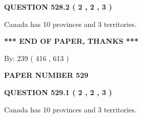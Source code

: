 \documentclass[12pt]{article}
\begin{document}
 
  
\vspace{0.2in}
  
{\textbf{\Large{QUESTION
528.2 
 ( 2 , 2 , 3 )
}}}
  
  
 
 
\noindent{}
 
 
Canada has 10  provinces and 3 territories.
 
 
 
 
   
   
 \vspace{0.2in}
 
   
   
   
   
\vspace{1.0in} 
{\textbf{\large{ *** END OF PAPER, THANKS *** }}} 
   
   
\hspace{1.0in} By: 
 239 ( 416 ,  613 )
   
   
   
   
\newpage 
\setcounter{page}{ 
   529001 } 
   
   
   
   
 {\textbf{ \Large{ PAPER NUMBER  529  }}}
   
   
\vspace{0.2in}
   
   
   
   
   
   
 \vspace{0.2in}
 
 
 
 
   
   
  
\vspace{0.2in}
  
{\textbf{\Large{QUESTION
529.1 
 ( 2 , 2 , 3 )
}}}
  
  
 
 
\noindent{}
 
 
Canada has 10  provinces and 3 territories.
 
 
 
 
  
\vspace{0.2in}
  
\end{document}
